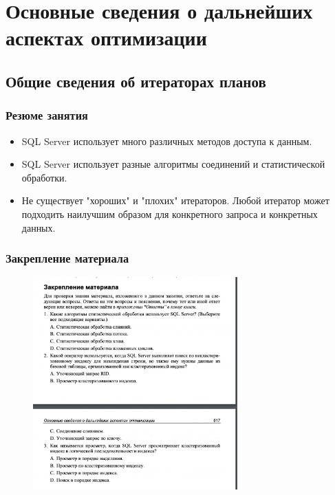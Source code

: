 \chapter{Основные сведения о дальнейших аспектах оптимизации}
\section{Общие сведения об итераторах планов}

\subsection*{Резюме занятия}
\begin{itemize}
	\item SQL Server использует много различных методов доступа к данным. 
	\item SQL Server использует разные алгоритмы соединений и статистической обработки. 
	\item Не существует "хороших" и "плохих" итераторов. Любой итератор может подходить наилучшим образом для конкретного запроса и конкретных данных. 
\end{itemize}

\subsection*{Закрепление материала}

\begin{figure}[h!]
	\begin{center}
		\includegraphics[width=0.7\textwidth]{img/zakrep48.png}
	\end{center}
	\captionsetup{justification=centering}
\end{figure}
\newpage

